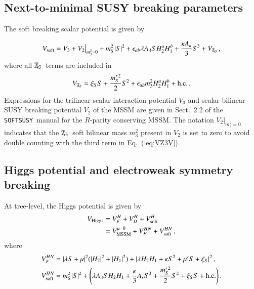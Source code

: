 \documentclass[final,3p,times]{elsarticle}
\def\SOFTSUSY{{\tt SOFTSUSY}}
\newcommand{\be}{\begin{equation}}
\newcommand{\ee}{\end{equation}}
\newcommand{\Zv}{\,\mathbf{\backslash}\mkern-11.0mu{\mathbb{Z}}_{3}} %
\newcommand{\ds}{\displaystyle}
\begin{document}
\subsection{Next-to-minimal SUSY breaking parameters \label{sec:susybreak}}
The soft breaking scalar potential is given by

\be 
V_{\textrm{soft}} = V_3 + V_2\big|^{}_{m_3^2=0} + m_S^2|S|^2 
+ \epsilon_{ab} \lambda A_\lambda S H^a_2 H^b_1 
+ \frac{\kappa A_\kappa}{3} S^3 + V_{\Zv} \,,
\ee 
%
where all $\Zv$~terms are included in
\be 
V_{\Zv} =  \xi_S S + \frac{m_S^{\prime \, 2}}{2} S^2
  + \epsilon_{ab} m_3^2 H_2^a H_1^b + \textrm{h.c.} \,.
\label{eq:VZ3V}
\ee
% 
Expressions for the trilinear scalar interaction potential $V_3$ and scalar 
bilinear SUSY breaking potential $V_2$  of the MSSM are given in Sect.\ 2.2 of 
the \SOFTSUSY~manual \cite{Allanach:2001kg} for the $R$-parity conserving MSSM.
 The notation $V_2\big|_{m_3^2=0}$ indicates that the $\Zv$~soft bilinear mass 
$m_3^2$ present in $V_2$ is set to zero to avoid double counting with the third term in Eq.~(\ref{eq:VZ3V}).

\subsection{Higgs potential and electroweak symmetry breaking}\label{sec:hpot}
At tree-level, the Higgs potential is given by
%
\begin{align}
V_\mathrm{Higgs} &=  V^H_F + V^H_D + V_{\rm soft}^H  \\
&=  V^{\mu=0}_\mathrm{MSSM} + V^{HN}_{F} + V_{\rm soft}^{HN}\,,
%
\end{align} 
where 
\begin{align}
V^{HN}_{F} &=   |\lambda S + \mu|^2 (|H_2|^2+|H_1|^2) + |\lambda H_2H_1
+\kappa S^2 + \mu^\prime S + \xi_S|^2  \,, \label{eq:HpotF} \\
 V_{\rm soft}^{HN}  &=   m_S^2|S|^2
+ \Bigg(\lambda A_{\lambda}SH_2H_1+\frac{\kappa}{3} A_{\kappa}S^3+ \ds\frac{m_S^{\prime \, 2}}{2} S^2 + \xi_S S + \textrm{h.c.} \Bigg)\,.
\label{eq:HpotS} 
\end{align}
\end{document}
